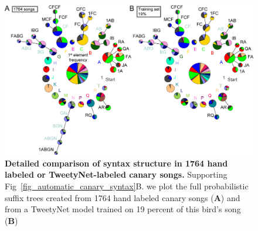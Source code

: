 \documentclass[10pt,letterpaper]{article}
\begin{document}
\begin{figure}[!ht]
\includegraphics[scale=0.85]{figures/Supplementaries/suppfig_tweety_vs_1764_hand_labeled_songs.png}
\caption{{\bf Detailed comparison of syntax structure in 1764 hand labeled or TweetyNet-labeled canary songs.} Supporting Fig~\ref{fig_automatic_canary_syntax}B. we plot the full probabilistic suffix trees created from 1764 hand labeled canary songs ({\bf A}) and from a TweetyNet model trained on 19 percent of this bird's song ({\bf B})}
\label{suppfig_tweetynet_vs_1764_hand_labeled_songs}
\end{figure}


\nolinenumbers

%
%
% 




\FloatBarrier

\end{document}
